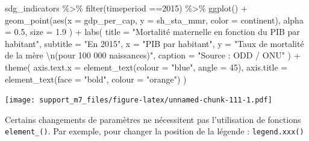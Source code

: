 \documentclass[
]{book}
\newenvironment{Shaded}{\begin{snugshade}}{\end{snugshade}}
\newcommand{\AttributeTok}[1]{\textcolor[rgb]{0.77,0.63,0.00}{#1}}
\newcommand{\DecValTok}[1]{\textcolor[rgb]{0.00,0.00,0.81}{#1}}
\newcommand{\FloatTok}[1]{\textcolor[rgb]{0.00,0.00,0.81}{#1}}
\newcommand{\FunctionTok}[1]{\textcolor[rgb]{0.00,0.00,0.00}{#1}}
\newcommand{\NormalTok}[1]{#1}
\newcommand{\SpecialCharTok}[1]{\textcolor[rgb]{0.00,0.00,0.00}{#1}}
\newcommand{\StringTok}[1]{\textcolor[rgb]{0.31,0.60,0.02}{#1}}
\begin{document}
\begin{Shaded}
\begin{Highlighting}[]
\NormalTok{sdg\_indicators }\SpecialCharTok{\%\textgreater{}\%} 
  \FunctionTok{filter}\NormalTok{(timeperiod }\SpecialCharTok{==}\DecValTok{2015}\NormalTok{) }\SpecialCharTok{\%\textgreater{}\%} 
  \FunctionTok{ggplot}\NormalTok{() }\SpecialCharTok{+}
  \FunctionTok{geom\_point}\NormalTok{(}\FunctionTok{aes}\NormalTok{(}\AttributeTok{x =}\NormalTok{ gdp\_per\_cap, }
                 \AttributeTok{y =}\NormalTok{ sh\_sta\_mmr,}
                 \AttributeTok{color =}\NormalTok{ continent),}
    \AttributeTok{alpha =} \FloatTok{0.5}\NormalTok{, }
    \AttributeTok{size =} \FloatTok{1.9}
\NormalTok{  ) }\SpecialCharTok{+}
  \FunctionTok{labs}\NormalTok{(}
    \AttributeTok{title =} \StringTok{"Mortalité maternelle en fonction du PIB par habitant"}\NormalTok{,}
    \AttributeTok{subtitle =} \StringTok{"En 2015"}\NormalTok{,}
    \AttributeTok{x =} \StringTok{"PIB par habitant"}\NormalTok{,}
    \AttributeTok{y =} \StringTok{"Taux de mortalité de la mère }\SpecialCharTok{\textbackslash{}n}\StringTok{(pour 100 000 naissances)"}\NormalTok{,}
    \AttributeTok{caption =} \StringTok{"Source : ODD / ONU"}
\NormalTok{  ) }\SpecialCharTok{+}
  \FunctionTok{theme}\NormalTok{(}
    \AttributeTok{axis.text.x =} \FunctionTok{element\_text}\NormalTok{(}\AttributeTok{colour =} \StringTok{"blue"}\NormalTok{, }\AttributeTok{angle =} \DecValTok{45}\NormalTok{),}
    \AttributeTok{axis.title =} \FunctionTok{element\_text}\NormalTok{(}\AttributeTok{face =} \StringTok{"bold"}\NormalTok{, }\AttributeTok{colour =} \StringTok{"orange"}\NormalTok{)}
\NormalTok{  )}
\end{Highlighting}
\end{Shaded}

\texttt{[image: support\_m7\_files/figure-latex/unnamed-chunk-111-1.pdf]}

Certains changements de paramètres ne nécessitent pas l'utilisation de fonctions \texttt{element\_()}.
Par exemple, pour changer la position de la légende : \texttt{legend.xxx()}
\end{document}
